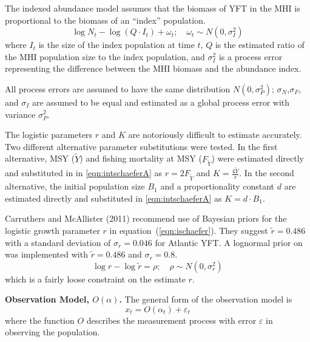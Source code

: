 \documentclass[12pt,letterpaper,twoside]{article}
\newcommand\MSY{\widetilde{Y}}
\newcommand\Fmsy{F_{\MSY}}
\begin{document}
The indexed abundance model
assumes that the biomass of YFT in the MHI
is proportional to the biomass of an ``index'' population.
\begin{equation}
\log N_t - \log (Q\cdot I_t) + \omega_t;\quad \omega_t\sim N(0,\sigma^2_I)
\label{eqn:index}
\end{equation}
where
$I_t$ is the size of the index population at time $t$,
$Q$ is the estimated ratio of the MHI population size to the index
population,
and $\sigma^2_I$ is a process error representing the difference
between the MHI biomass and the abundance index. 

All process errors are assumed to have the same distribution
$N(0,\sigma^2_P)$; $\sigma_N$,$\sigma_F$, and $\sigma_I$ are assumed
to be equal and estimated as a global process error with variance
$\sigma^2_P$.

The logistic parameters $r$ and $K$ are notoriously difficult to estimate
accurately. Two different
alternative parameter substitutions were tested. In the first
alternative, MSY ($\MSY$) and fishing mortality at MSY ($\Fmsy$) were
estimated directly and substituted in in \ref{eqn:intschaeferA} as
$r=2F_{\MSY}$ and $K=\frac{4\MSY}{r}$.
In the second alternative, the initial population size $B_1$ and a
proportionality constant $d$ are estimated directly and substituted in
\ref{eqn:intschaeferA} as $K=d\cdot B_1$.

Carruthers and McAllister (2011) recommend use of Bayesian priors for the
logistic growth parameter $r$ in equation~(\ref{eqn:ischaefer}). They
suggest $\tilde{r} = 0.486$ with a standard deviation of $\sigma_r = 0.046$
for Atlantic YFT.
A lognormal prior on was implemented with 
$\tilde{r} = 0.486$ and $\sigma_r = 0.8$.
\begin{equation}
\log r - \log \tilde{r} = \rho ;\quad \rho\sim N(0,\sigma^2_r)
\end{equation}
which is a fairly loose constraint on the estimate $r$.

{\bf Observation Model, $O(\alpha)$.}
The general form of the observation model is
\begin{equation}
x_t = O(\alpha_t) + \varepsilon_t
\end{equation}
where the function $O$ describes the measurement process with
error $\varepsilon$ in observing the population.
\end{document}
